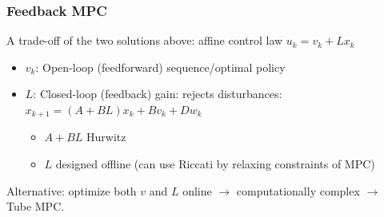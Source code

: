 \subsubsection{Feedback MPC}
A trade-off of the two solutions above: affine control law \quad $\boxed{u_k = v_k + Lx_k}$
\begin{itemize}
    \item $v_k$: Open-loop (feedforward) sequence/optimal policy
    \item $L$: Closed-loop (feedback) gain: rejects disturbances: \quad $x_{k+1} = (A+BL)x_k + Bv_k + Dw_k$
    \begin{itemize}
        \item $A+BL$ Hurwitz
        \item $L$ designed offline (can use Riccati by relaxing constraints of MPC)
    \end{itemize}
\end{itemize}
Alternative: optimize both $v$ and $L$ online $\rightarrow$ computationally complex $\rightarrow$ Tube MPC.

\newpage


